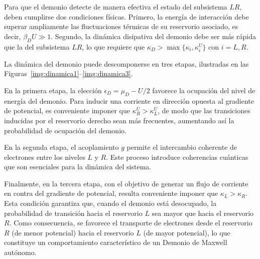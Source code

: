Para que el demonio detecte de manera efectiva el estado del subsistema $LR$, deben cumplirse dos condiciones físicas. Primero, la energía de interacción debe superar ampliamente las fluctuaciones térmicas de su reservorio asociado, es decir, $\beta_{D} U \gg 1$. Segundo, la dinámica disipativa del demonio debe ser más rápida que la del subsistema $LR$, lo que requiere que $\kappa_{D} > \max\{\kappa_{i}, \kappa^{U}_{i}\}$ con $i = L, R$.

La dinámica del demonio puede descomponerse en tres etapas, ilustradas en las Figuras~\ref{img:dinamica1}–\ref{img:dinamica3}.  


En la primera etapa, la elección $\epsilon_D = \mu_D - U/2$ favorece la ocupación del nivel de energía del demonio. Para inducir una corriente en dirección opuesta al gradiente de potencial, es conveniente imponer que $\kappa^{U}_{R} > \kappa^{U}_{L}$, de modo que las transiciones inducidas por el reservorio derecho sean más frecuentes, aumentando así la probabilidad de ocupación del demonio.  


En la segunda etapa, el acoplamiento $g$ permite el intercambio coherente de electrones entre los niveles $L$ y $R$. Este proceso introduce coherencias cuánticas que son esenciales para la dinámica del sistema.  


Finalmente, en la tercera etapa, con el objetivo de generar un flujo de corriente en contra del gradiente de potencial, resulta conveniente imponer que $\kappa_{L} > \kappa_{R}$. Esta condición garantiza que, cuando el demonio está desocupado, la probabilidad de transición hacia el reservorio $L$ sea mayor que hacia el reservorio $R$. Como consecuencia, se favorece el transporte de electrones desde el reservorio $R$ (de menor potencial) hacia el reservorio $L$ (de mayor potencial), lo que constituye un comportamiento característico de un Demonio de Maxwell autónomo.


